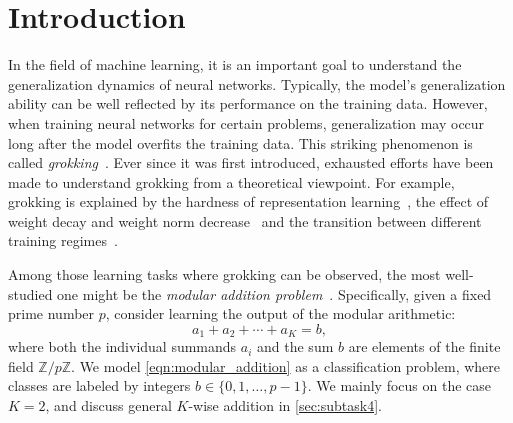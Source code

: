 \section{Introduction}
\label{sec:intro}

In the field of machine learning, it is an important goal to understand the generalization dynamics of neural networks.
Typically, the model's generalization ability can be well reflected by its performance on the training data.
However, when training neural networks for certain problems, generalization may occur long after the model overfits the training data. 
This striking phenomenon is called \emph{grokking}~\cite{Grokking}. 
Ever since it was first introduced, exhausted efforts have been made to understand grokking from a theoretical viewpoint.
For example, grokking is explained by the hardness of representation learning~\cite{LiuKNMTW22},
the effect of weight decay and weight norm decrease~\cite{Grokking_circuit_efficiency,LiuMT23}
and the transition between different training regimes~\cite{KumarBGP24,MohamadiLWS24}.

Among those learning tasks where grokking can be observed, the most well-studied one might be the \emph{modular addition problem}~\cite{Grokking,KumarBGP24,MohamadiLWS24,Gromov}.
Specifically, given a fixed prime number $p$, consider learning the output of the modular arithmetic: %
\begin{equation}
    a_{1} + a_{2} + \cdots + a_{K} = b,
    \label{eqn:modular_addition}
\end{equation}
where both the individual summands $a_i$ and the sum $b$ are elements of the finite field $\mathbb{Z}/p\mathbb{Z}$.
We model \eqref{eqn:modular_addition} as a classification problem, where classes are labeled by integers $b \in \{0, 1, \dots, p-1\}$.
We mainly focus on the case $K=2$, and discuss general $K$-wise addition in \cref{sec:subtask4}.


